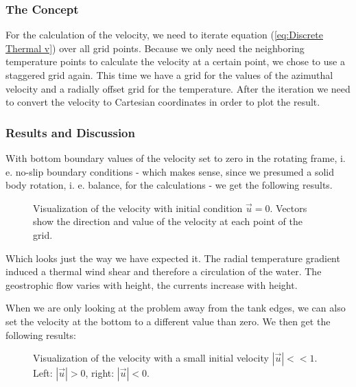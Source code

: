 \documentclass[12pt, a4paper]{article} %
\newcommand{\todoFormat}{\todo[color=blue!20]}
\begin{document}
		
		\subsubsection{The Concept}  %
			For the calculation of the velocity, we need to iterate equation (\ref{eq:Discrete Thermal v}) over all grid points. Because we only need the neighboring temperature points to calculate the velocity at a certain point, we chose to use a staggered grid again. This time we have a grid for the values of the azimuthal velocity and a radially offset grid for the temperature. After the iteration we need to convert the velocity to Cartesian coordinates in order to plot the result.
			
		\subsubsection{Results and Discussion}
			With bottom boundary values of the velocity set to zero in the rotating frame, i. e. no-slip boundary conditions - which makes sense, since we presumed a solid body rotation, i. e. balance, for the calculations - we get the following results.
			
			\begin{figure}[h]
				\centering
					\qquad
				\caption{Visualization of the velocity with initial condition $\vec{u}=0$. Vectors show the direction and value of the velocity at each point of the grid.}
			\end{figure}
			
			Which looks just the way we have expected it. The radial temperature gradient induced a thermal wind shear and therefore a circulation of the water. The geostrophic flow varies with height, the currents increase with height.
			
			When we are only looking at the problem away from the tank edges, we can also set the velocity  at the bottom to a different value than zero. We then get the following results:
			\todoFormat{anders schreiben}
			
			\begin{figure}[h]
				\centering
					\qquad
				\caption{Visualization of the velocity with a small initial velocity $|\vec{u}|<<1$. Left: $|\vec{u}|>0$, right: $|\vec{u}|<0$.}
			\end{figure}
			
\end{document}
